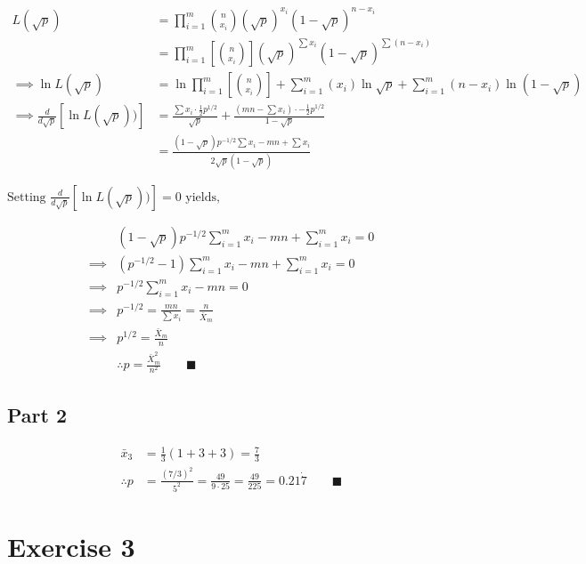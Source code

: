 \documentclass{article}
\begin{document}
$$
\begin{aligned}
L(\sqrt{ p }) &= \prod_{i=1}^{m} \binom{n}{x_{i}} (\sqrt{ p })^{x_{i}}(1-\sqrt{ p })^{n-x_{i}} \\
&= \prod_{i=1}^m \left[ \binom{n}{x_{i}}\right] (\sqrt{ p })^{\sum x_{i}}(1-\sqrt{ p })^{\sum (n-x_{i})} \\
\implies \ln{L(\sqrt{ p })} &= \ln{\prod_{i=1}^m \left[ \binom{n}{x_{i}}\right]} + \sum_{i=1}^m{(x_i)}\ln{\sqrt{ p }}+\sum_{i=1}^m{(n-x_{i})}\ln{(1-\sqrt{p})} \\
\implies \frac{d}{d\sqrt{ p }}[\ln{L(\sqrt{ p })})] &= \frac{\sum x_{i} \cdot \frac{1}{2} p^{1/2}}{\sqrt{ p }} + \frac{\left( mn - \sum x_{i} \right) \cdot -\frac{1}{2} p^{1/2}}{1 - \sqrt{ p }} \\
&= \frac{(1-\sqrt{ p })p^{-1/2} \sum x_{i} - mn + \sum x_{i}}{2\sqrt{ p } (1-\sqrt{ p })}
\end{aligned}
$$

$\text{Setting } \frac{d}{d\sqrt{ p }}[\ln{L(\sqrt{ p })})]  = 0 \text{ yields,}$

$$
\begin{aligned}
&(1-\sqrt{ p })p^{-1/2} \sum_{i=1}^m x_{i} - mn + \sum_{i=1}^m x_{i} = 0 \\
\implies &(p^{-1/2} - 1) \sum_{i=1}^m x_{i} - mn + \sum_{i=1}^m x_{i} = 0 \\
\implies &p^{-1/2} \sum_{i=1}^m x_{i} - mn = 0 \\
\implies &p^{-1/2} = \frac{mn}{\sum x_{i}} = \frac{n}{\bar{X}_{m}} \\
\implies &p^{1/2} = \frac{\bar{X}_{m}}{n} \\
& \therefore p = \frac{\bar{X}_{m}^2}{n^2} \qquad \blacksquare
\end{aligned}
$$

\subsection*{Part 2}
$$
\begin{aligned}
\bar{x}_{3} &= \frac{1}{3} (1 + 3 + 3) = \frac{7}{3} \\
\therefore p &= \frac{(7/3)^2}{5^2} = \frac{49}{9 \cdot 25} = \frac{49}{225} = 0.21\dot{7} \qquad \blacksquare
\end{aligned}
$$


\newpage
\section*{Exercise 3}
\end{document}
